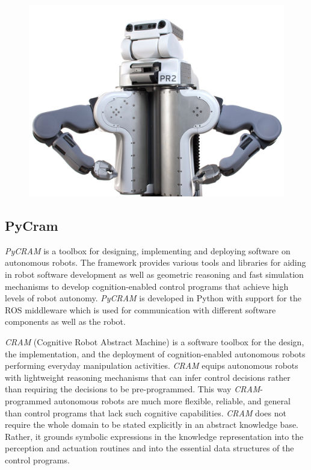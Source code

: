    \begin{figure}[H]
    \includegraphics[scale=0.1]{Graphics/pr2.jpg}
    \end{figure}
    \subsection{PyCram}
	\textit{PyCRAM} is a toolbox for designing, implementing and deploying software on autonomous robots. The framework provides various tools and libraries for aiding in robot software development as well as geometric reasoning and fast simulation mechanisms to develop cognition-enabled control programs that achieve high levels of robot autonomy.
    \textit{PyCRAM} is developed in Python with support for the ROS middleware which is used for communication with different software components as well as the robot.
    
    \textit{CRAM} (Cognitive Robot Abstract Machine) \cite{beetz10cram} is a software toolbox for the design, the implementation, and the deployment of cognition-enabled autonomous robots performing everyday manipulation activities.
	\textit{CRAM} equips autonomous robots with lightweight reasoning mechanisms that can infer control decisions rather than requiring the decisions to be pre-programmed. 
	This way \textit{CRAM}-programmed autonomous robots are much more flexible, reliable, and general than control programs that lack such cognitive capabilities. 
	\textit{CRAM} does not require the whole domain to be stated explicitly in an abstract knowledge base. Rather, it grounds symbolic expressions in the knowledge representation into the perception and actuation routines and into the essential data structures of the control programs. 

